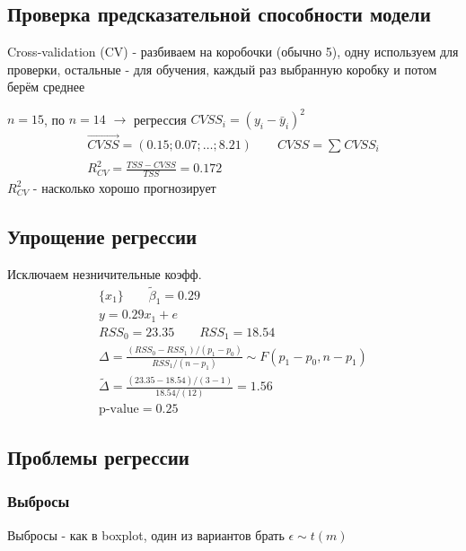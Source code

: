 \documentclass{article}
\begin{document}
\subsection{Проверка предсказательной способности модели}
Cross-validation (CV) - разбиваем на коробочки (обычно 5), одну используем для проверки,
остальные - для обучения, каждый раз выбранную коробку и потом берём среднее
\begin{eg}
  $n=15$, по $n = 14$ $\rightarrow$ регрессия $CVSS_i=(y_i - \bar{y}_i)^{2}$
  \begin{gather*}
    \vec{CVSS}=(0.15;0.07; \dots ; 8.21) \qquad CVSS=\sum_{}^{}CVSS_i \\ 
    R^{2}_{CV}=\frac{TSS-CVSS}{TSS}=0.172
  \end{gather*}
  $R^{2}_{CV}$ - насколько хорошо прогнозирует
\end{eg}
\subsection{Упрощение регрессии}
Исключаем незничительные коэфф.
\begin{gather*}
  \{x_1\} \qquad \tilde{\beta}_1=0.29 \\ 
  y=0.29x_1 + e \\ 
  RSS_0=23.35 \qquad RSS_1=18.54 \\
  \Delta=\frac{(RSS_0-RSS_1)/(p_1-p_0)}{RSS_1/(n-p_1)} \sim F(p_1-p_0, n-p_1) \\ 
  \tilde{\Delta} = \frac{(23.35-18.54)/(3-1)}{18.54 / (12)} = 1.56 \\ 
  \text{p-value} = 0.25 
\end{gather*}


\subsection{Проблемы регрессии}
\subsubsection{Выбросы}
Выбросы - как в boxplot, один из вариантов брать $\epsilon \sim t(m)$
\end{document}

